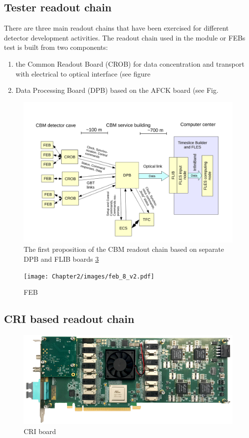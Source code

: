 \subsection{Tester readout chain}

There are three main readout chains that have been exercised for different detector development activities.  
The readout chain used in the module or FEBs test is built from two components: 
\begin{enumerate}
    \item the Common Readout Board (\gls{CROB}) for data concentration and transport with electrical to optical interface (see figure 
    \item Data Processing Board (DPB) based on the AFCK board (see Fig.
\end{enumerate}

\begin{figure}[!h]
\centering
\includegraphics[width=0.75\columnwidth]{Chapter2/images/DPB.png}
\caption{The first proposition of the CBM readout chain based on separate DPB and FLIB boards \ref{fig_cri_board}}
\label{fig_dpb_scheme}
\end{figure}

\begin{figure}[!h]
\centering
\texttt{[image: Chapter2/images/feb\_8\_v2.pdf]}
\caption{FEB}
\label{fig_febA_photo}
\end{figure}
\subsection{CRI based readout chain}
\begin{figure}[!h]
\centering
\includegraphics[width=0.65\columnwidth]{Chapter2/images/cri_board_atlas.pdf}
\caption{CRI board}
\label{fig_cri_board}
\end{figure}

